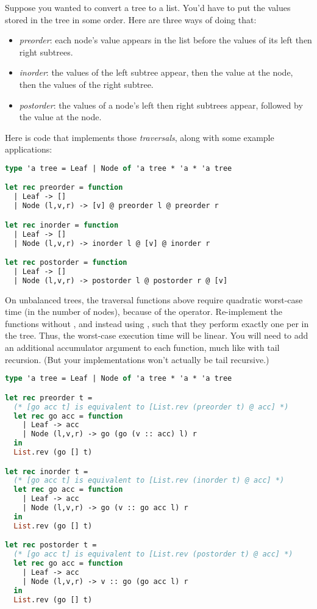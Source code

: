 Suppose you wanted to convert a tree to a list. You'd have to put the values stored in the tree in some order. Here are three ways of doing that:
\begin{itemize}
  \item \textit{preorder}: each node's value appears in the list before the values of its left then right subtrees.
  \item \textit{inorder}: the values of the left subtree appear, then the value at the node, then the values of the right subtree.
  \item \textit{postorder}: the values of a node's left then right subtrees appear, followed by the value at the node.
\end{itemize}
Here is code that implements those \textit{traversals}, along with some example applications:
\begin{lstlisting}[language=OCaml]
type 'a tree = Leaf | Node of 'a tree * 'a * 'a tree

let rec preorder = function
  | Leaf -> []
  | Node (l,v,r) -> [v] @ preorder l @ preorder r

let rec inorder = function
  | Leaf -> []
  | Node (l,v,r) -> inorder l @ [v] @ inorder r

let rec postorder = function
  | Leaf -> []
  | Node (l,v,r) -> postorder l @ postorder r @ [v]
\end{lstlisting}
On unbalanced trees, the traversal functions above require quadratic worst-case time (in the number of nodes), because
of the  operator. Re-implement the functions without , and instead using \code{::}, such that they perform exactly one 
per  in the tree. Thus, the worst-case execution time will be linear. You will need to add an additional accumulator
argument to each function, much like with tail recursion. (But your implementations won't actually be tail recursive.)


\begin{lstlisting}[language=OCaml]
type 'a tree = Leaf | Node of 'a tree * 'a * 'a tree

let rec preorder t =
  (* [go acc t] is equivalent to [List.rev (preorder t) @ acc] *)
  let rec go acc = function
    | Leaf -> acc
    | Node (l,v,r) -> go (go (v :: acc) l) r
  in
  List.rev (go [] t)

let rec inorder t =
  (* [go acc t] is equivalent to [List.rev (inorder t) @ acc] *)
  let rec go acc = function
    | Leaf -> acc
    | Node (l,v,r) -> go (v :: go acc l) r
  in
  List.rev (go [] t)

let rec postorder t =
  (* [go acc t] is equivalent to [List.rev (postorder t) @ acc] *)
  let rec go acc = function
    | Leaf -> acc
    | Node (l,v,r) -> v :: go (go acc l) r
  in
  List.rev (go [] t)
\end{lstlisting}

